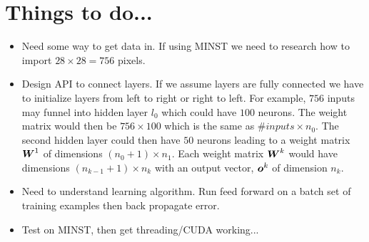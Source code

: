 \documentclass[12pt,notitlepage]{article}
\begin{document}
\section{Things to do...}
\label{sec:things-to-do}
\begin{itemize}
\item Need some way to get data in.  If using MINST we need to
  research how to import $28 \times 28 = 756$ pixels.
\item Design API to connect layers.  If we assume layers are fully
  connected we have to initialize layers from left to right or right
  to left.  For example, $756$ inputs may funnel into hidden layer
  $l_0$ which could have $100$ neurons.  The weight matrix would then
  be $756 \times 100$ which is the same as $\#inputs \times n_{0}$.
  The second hidden layer could then have $50$ neurons leading to a
  weight matrix $\boldsymbol{W}^{1}$ of dimensions $(n_{0}+1) \times n_{1}$.
  Each weight matrix $\boldsymbol{W}^{k}$ would have dimensions $(n_{k-1}+1)
  \times n_{k}$ with an output vector, $\boldsymbol{o}^{k}$ of dimension
  $n_{k}$.
\item Need to understand learning algorithm.  Run feed forward on a
  batch set of training examples then back propagate error.

\item Test on MINST, then get threading/CUDA working...
\end{itemize}
\end{document}
